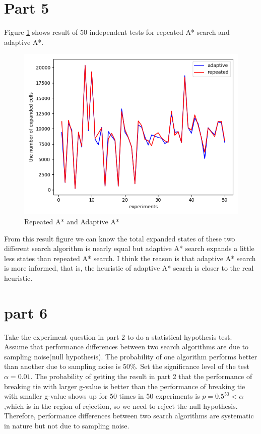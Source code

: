 \documentclass[11pt]{article}
\begin{document}
\section*{Part 5}
Figure \ref{fig:Fig5.ada} shows result of 50 independent tests for repeated A* search and adaptive A*.
\begin{figure}[htb]
	\centering
	\includegraphics[scale = 0.3]{repeated_adaptive.png}
	\caption{Repeated A* and Adaptive A*}
	\label{fig:Fig5.ada}
\end{figure}
\newline
From this result figure we can know the total expanded states of these two different search algorithm is nearly equal but adaptive A* search expands a little less states than repeated A* search. I think the reason is that adaptive A* search is more informed, that is, the heuristic of adaptive A* search is closer to the real heuristic.  




\section*{part 6}
Take the experiment question in part 2 to do a statistical hypothesis test.
Assume that performance differences between two search algorithms  are  due to sampling noise(null hypothesis). The probability of one algorithm performs better than another due to sampling noise is 50\%. Set the significance level of the  test $\alpha=0.01$. The probability of getting the result in part 2 that the performance of breaking tie with larger g-value is better than the performance of breaking tie with smaller g-value shows up for 50 times in 50 experiments is $p=0.5^{50}<\alpha$,which is in the region of rejection, so we need to reject the null hypothesis. Therefore, performance differences between two search algorithms are systematic
in nature but not due to sampling noise.
\end{document}
